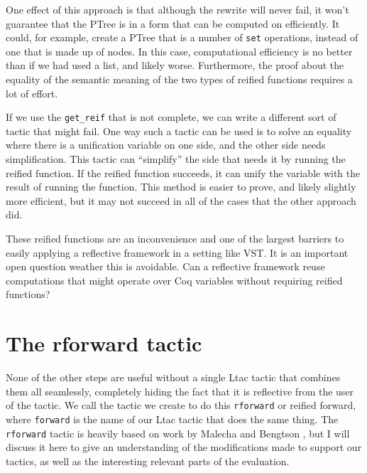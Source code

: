 \documentclass{puthesis}
\begin{document}
One effect of this approach is that although the rewrite will never
fail, it won't guarantee that the PTree is in a form that can be
computed on efficiently. It could, for example, create a PTree that is
a number of \lstinline|set| operations, instead of one that is made up
of nodes. In this case, computational efficiency is no better than if
we had used a list, and likely worse. Furthermore, the proof about the
equality of the semantic meaning of the two types of reified functions
requires a lot of effort.

If we use the \lstinline|get_reif| that is not complete, we can write a
different sort of tactic that might fail. One way such a tactic can be
used is to solve an equality where there is a unification variable on
one side, and the other side needs simplification. This tactic can
``simplify'' the side that needs it by running the reified
function. If the reified function succeeds, it can unify the variable
with the result of running the function. This method is easier to
prove, and likely slightly more efficient, but it may not succeed in
all of the cases that the other approach did.

These reified functions are an inconvenience and one of the largest
barriers to easily applying a reflective framework in a setting like
VST. It is an important open question weather this is avoidable. Can
a reflective framework reuse computations that might operate
over Coq variables without requiring reified functions? 

\section{The rforward tactic}

None of the other steps are useful without a single Ltac tactic that
combines them all seamlessly, completely hiding the fact that it is
reflective from the user of the tactic. We call the tactic we create
to do this \lstinline|rforward| or reified forward, where
\lstinline|forward| is the name of our Ltac tactic that does the same
thing. The \lstinline|rforward| tactic is heavily based on work by
Malecha and Bengtson \cite{}, but I will discuss it here to give an
understanding of the modifications made to support our tactics, as well
as the interesting relevant parts of the evaluation. 
\end{document}
